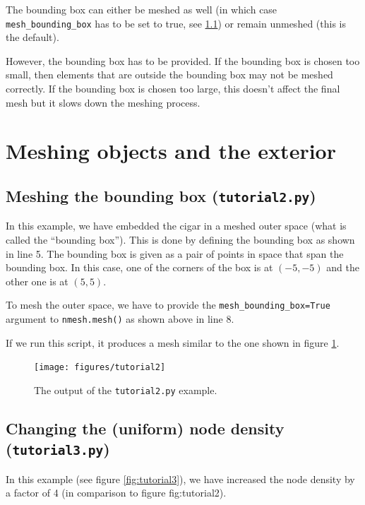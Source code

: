 \documentclass[10pt,a4paper]{book}
\newcommand{\py}[1]{\texttt{\color{blue}#1}}
\begin{document}
The bounding box can either be meshed as well (in which case
\py{mesh\_bounding\_box} has to be set to true, see
\ref{sec:meshingtheboundingbox}) or remain unmeshed (this is the
default).

However, the bounding box has to be provided. If the bounding box is
chosen too small, then elements that are outside the bounding box may
not be meshed correctly. If the bounding box is chosen too large, this
doesn't affect the final mesh but it slows down the meshing process.

\section{Meshing objects and the exterior}

\subsection{Meshing the bounding box (\texttt{tutorial2.py})}
\label{sec:meshingtheboundingbox}



In this example, we have embedded the cigar in a meshed outer space
(what is called the ``bounding box''). This is done by defining the
bounding box as shown in line 5. The bounding box is given as a pair
of points in space that span the bounding box. In this case, one of
the corners of the box is at $(-5,-5)$ and the other one is at
$(5,5)$. 

To mesh the outer space, we have to provide the
\py{mesh\_bounding\_box=True} argument to \py{nmesh.mesh()} as shown
above in line 8.


If we run this script, it produces a mesh similar to the one shown in figure \ref{fig:tutorial2}.

\begin{figure}[tbh]
\centerline{\texttt{[image: figures/tutorial2]}}
\caption{\label{fig:tutorial2}The output of the \py{tutorial2.py} example.}
\end{figure}


 
\subsection{Changing the  (uniform) node density (\texttt{tutorial3.py})}



In this example (see figure \ref{fig:tutorial3}), we have increased the node density by a factor of 4 (in comparison to figure {fig:tutorial2}). 
\end{document}
